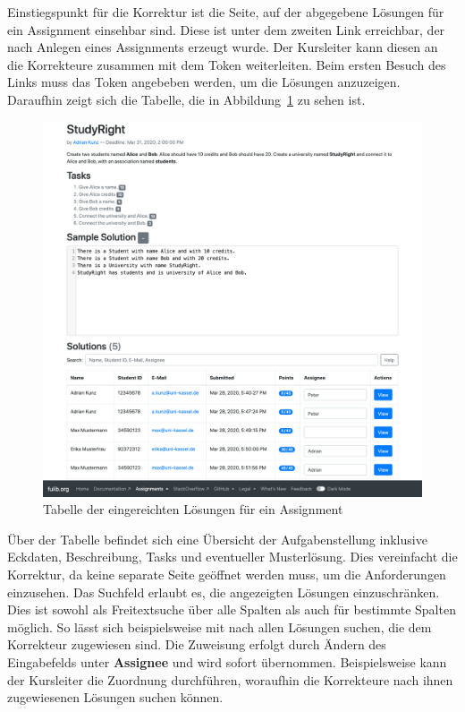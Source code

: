 Einstiegspunkt für die Korrektur ist die Seite, auf der abgegebene Lösungen für ein Assignment einsehbar sind.
Diese ist unter dem zweiten Link erreichbar, der nach Anlegen eines Assignments erzeugt wurde.
Der Kursleiter kann diesen an die Korrekteure zusammen mit dem Token weiterleiten.
Beim ersten Besuch des Links muss das Token angebeben werden, um die Lösungen anzuzeigen.
Daraufhin zeigt sich die Tabelle, die in Abbildung~\ref{fig:solution-table} zu sehen ist.

\begin{figure}
    \centering
    \includegraphics[width=\textwidth]{chapter/fulib.org/img/solution-table.png}
    \caption{Tabelle der eingereichten Lösungen für ein Assignment}
    \label{fig:solution-table}
\end{figure}

Über der Tabelle befindet sich eine Übersicht der Aufgabenstellung inklusive Eckdaten, Beschreibung, Tasks und eventueller Musterlösung.
Dies vereinfacht die Korrektur, da keine separate Seite geöffnet werden muss, um die Anforderungen einzusehen.
Das Suchfeld erlaubt es, die angezeigten Lösungen einzuschränken.
Dies ist sowohl als Freitextsuche über alle Spalten als auch für bestimmte Spalten möglich.
So lässt sich beispielsweise mit  nach allen Lösungen suchen, die dem Korrekteur  zugewiesen sind.
Die Zuweisung erfolgt durch Ändern des Eingabefelds unter \textbf{Assignee} und wird sofort übernommen.
Beispielsweise kann der Kursleiter die Zuordnung durchführen, woraufhin die Korrekteure nach ihnen zugewiesenen Lösungen suchen können.


